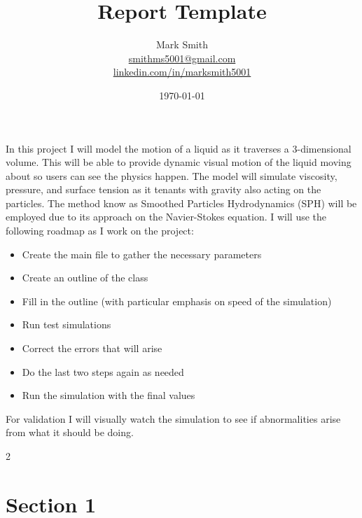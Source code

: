 \documentclass{article}
\title{Report Template}
\author{
    Mark Smith \\ 
    \small \href{mailto:smithms5001@gmail.com}{smithms5001@gmail.com} \\ 
    \small \href{https://www.linkedin.com/in/marksmith5001}{linkedin.com/in/marksmith5001}}
\date{\today}
\begin{document}
\maketitle


\section*{}
    
    In this project I will model the motion of a liquid as it traverses a 3-dimensional volume.
    This will be able to provide dynamic visual motion of the liquid moving about so users can see the physics happen.
    The model will simulate viscosity, pressure, and surface tension as it tenants with gravity also acting on the particles.
    The method know as Smoothed Particles Hydrodynamics (SPH) will be employed due to its approach on the Navier-Stokes equation.
    I will use the following roadmap as I work on the project:
    \begin{itemize}
        \item Create the main file to gather the necessary parameters
        \item Create an outline of the class
        \item Fill in the outline (with particular emphasis on speed of the simulation)
        \item Run test simulations
        \item Correct the errors that will arise
        \item Do the last two steps again as needed
        \item Run the simulation with the final values
    \end{itemize}
    For validation I will visually watch the simulation to see if abnormalities arise from what it should be doing.
\vspace{1.5mm}



\begin{multicols}{2}
    
\section{Section 1}


% 

\end{multicols}
\end{document}
